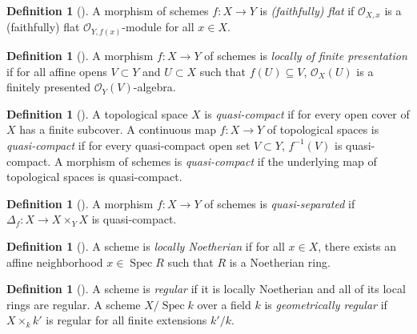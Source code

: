 \documentclass{amsart}
\theoremstyle{definition}
\newtheorem{defn}[thm]{Definition}
\theoremstyle{remark}
\theoremstyle{plain}
\theoremstyle{definition}
\theoremstyle{remark}
\newcommand{\mc}[1]{\mathcal{#1}}
\newcommand{\1}{\mathbf{1}}
\newcommand{\2}{\mathbf{2}}
\newcommand{\3}{\mathbf{3}}
\DeclareMathOperator{\Spec}{Spec}
\begin{document}
\begin{defn}[{\cite[Definition 2.6.1]{schemesnotes}}]
    A morphism of schemes $f \colon X \to Y$ is \textit{(faithfully) flat} if $\mc{O}_{X,x}$ is a (faithfully) flat $\mc{O}_{Y,f(x)}$-module for all $x \in X$.
\end{defn}

\begin{defn}[{\cite[\href{https://stacks.math.columbia.edu/tag/01TQ}{Tag 01TQ}]{stacks}}]
    A morphism $f \colon X \to Y$ of schemes is \textit{locally of finite presentation} if for all affine opens $V \subset Y$ and $U \subset X$ such that $f(U) \subseteq V$, $\mc{O}_X(U)$ is a finitely presented $\mc{O}_Y(V)$-algebra.
\end{defn}

\begin{defn}[{\cite[\href{https://stacks.math.columbia.edu/tag/005A}{Tag 005A}, \href{https://stacks.math.columbia.edu/tag/01K3}{Tag 01K3}]{stacks}}]
    A topological space $X$ is \textit{quasi-compact} if for every open cover of $X$ has a finite subcover. A continuous map $f \colon X \to Y$ of topological spaces is \textit{quasi-compact} if for every quasi-compact open set $V \subset Y$, $f^{-1}(V)$ is quasi-compact. A morphism of schemes is \textit{quasi-compact} if the underlying map of topological spaces is quasi-compact.
\end{defn}

\begin{defn}[{\cite[Definition 1.8.4]{schemesnotes}}]
    A morphism $f \colon X \to Y$ of schemes is \textit{quasi-separated} if $\Delta_f \colon X \to X \times_Y X$ is quasi-compact.
\end{defn}

\begin{defn}[{\cite[Theorem 1.3.15]{schemesnotes}}]
    A scheme is \textit{locally Noetherian} if for all $x \in X$, there exists an affine neighborhood $x \in \Spec R$ such that $R$ is a Noetherian ring.
\end{defn}


\begin{defn}[{\cite[\href{https://stacks.math.columbia.edu/tag/038T}{Tag 038T}, \href{https://stacks.math.columbia.edu/tag/02IR}{Tag 02IR}]{stacks}}]
    A scheme is \textit{regular} if it is locally Noetherian and all of its local rings are regular. A scheme $X/\Spec k$ over a field $k$ is \textit{geometrically regular} if $X \times_k k'$ is regular for all finite extensions $k'/k$.
\end{defn}
\end{document}
